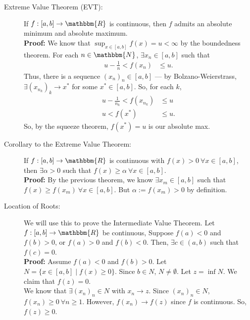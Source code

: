 \documentclass[10pt]{extarticle}
\newcommand{\N}{\mathbbm{N}}
\newcommand{\R}{\mathbbm{R}}
\begin{document}
    \begin{description}
      \item[Extreme Value Theorem (EVT):] If $f: [a,b] \rightarrow \R$ is continuous, then $f$ admits an absolute minimum and absolute maximum.\\

        \textbf{Proof:} We know that $\sup_{x\in[a,b]}f(x) = u < \infty$ by the boundedness theorem. For each $n\in \N$, $\exists x_n\in [a,b]$ such that
        \begin{align*}
          u-\frac{1}{n} < f(x_n) &\leq u.
        \end{align*}
        Thus, there is a sequence $(x_n)_n \in [a,b]$ --- by Bolzano-Weierstrass, $\exists (x_{n_k})_k \rightarrow x^{\ast}$ for some $x^{\ast}\in [a,b]$. So, for each $k$,
        \begin{align*}
          u-\frac{1}{n_k} < f(x_{n_k}) &\leq u\\
          u < f(x^{\ast}) &\leq u. \tag*{since $f$ is continuous}
        \end{align*}
        So, by the squeeze theorem, $f(x^{\ast}) = u$ is our absolute max.
      \item[Corollary to the Extreme Value Theorem:] If $f: [a,b]\rightarrow \R$ is continuous with $f(x) > 0~\forall x\in [a,b]$, then $\exists \alpha > 0$ such that $f(x) \geq \alpha~\forall x\in [a,b]$.\\

        \textbf{Proof:} By the previous theorem, we know $\exists x_m\in [a,b]$ such that $f(x) \geq f(x_m)~\forall x\in [a,b]$. But $\alpha:= f(x_m) > 0$ by definition.
      \item[Location of Roots:] We will use this to prove the Intermediate Value Theorem. Let $f: [a,b] \rightarrow \R$ be continuous, Suppose $f(a) < 0$ and $f(b) > 0$, or $f(a) > 0$ and $f(b) < 0$. Then, $\exists c\in (a,b)$ such that $f(c) = 0$.\\

        \textbf{Proof:} Assume $f(a) < 0$ and $f(b) > 0$. Let $N = \{x\in [a,b] \mid f(x) \geq 0\}$. Since $b\in N$, $N\neq \emptyset$. Let $z = \inf{N}$. We claim that $f(z) = 0$.\\

        We know that $\exists (x_n)_n \in N$ with $x_n \rightarrow z$. Since $(x_n)_n \in N$, $f(x_n) \geq 0~\forall n\geq 1$. However, $f(x_n) \rightarrow f(z)$ since $f$ is continuous. So, $f(z) \geq 0$.\\


\end{description}
\end{document}
